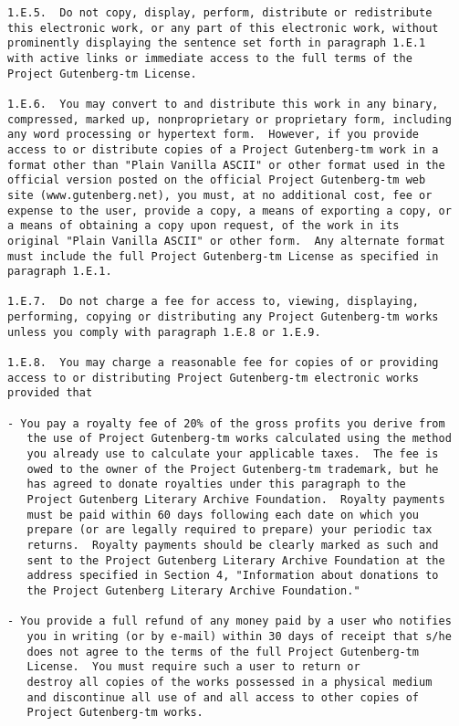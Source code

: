 \documentclass[letterpaper,12pt,oneside,openany]{memoir}
\begin{document}
\begin{verbatim}
1.E.5.  Do not copy, display, perform, distribute or redistribute
this electronic work, or any part of this electronic work, without
prominently displaying the sentence set forth in paragraph 1.E.1
with active links or immediate access to the full terms of the
Project Gutenberg-tm License.

1.E.6.  You may convert to and distribute this work in any binary,
compressed, marked up, nonproprietary or proprietary form, including
any word processing or hypertext form.  However, if you provide
access to or distribute copies of a Project Gutenberg-tm work in a
format other than "Plain Vanilla ASCII" or other format used in the
official version posted on the official Project Gutenberg-tm web
site (www.gutenberg.net), you must, at no additional cost, fee or
expense to the user, provide a copy, a means of exporting a copy, or
a means of obtaining a copy upon request, of the work in its
original "Plain Vanilla ASCII" or other form.  Any alternate format
must include the full Project Gutenberg-tm License as specified in
paragraph 1.E.1.

1.E.7.  Do not charge a fee for access to, viewing, displaying,
performing, copying or distributing any Project Gutenberg-tm works
unless you comply with paragraph 1.E.8 or 1.E.9.

1.E.8.  You may charge a reasonable fee for copies of or providing
access to or distributing Project Gutenberg-tm electronic works
provided that

- You pay a royalty fee of 20% of the gross profits you derive from
   the use of Project Gutenberg-tm works calculated using the method
   you already use to calculate your applicable taxes.  The fee is
   owed to the owner of the Project Gutenberg-tm trademark, but he
   has agreed to donate royalties under this paragraph to the
   Project Gutenberg Literary Archive Foundation.  Royalty payments
   must be paid within 60 days following each date on which you
   prepare (or are legally required to prepare) your periodic tax
   returns.  Royalty payments should be clearly marked as such and
   sent to the Project Gutenberg Literary Archive Foundation at the
   address specified in Section 4, "Information about donations to
   the Project Gutenberg Literary Archive Foundation."

- You provide a full refund of any money paid by a user who notifies
   you in writing (or by e-mail) within 30 days of receipt that s/he
   does not agree to the terms of the full Project Gutenberg-tm
   License.  You must require such a user to return or
   destroy all copies of the works possessed in a physical medium
   and discontinue all use of and all access to other copies of
   Project Gutenberg-tm works.


\end{verbatim}
\end{document}
